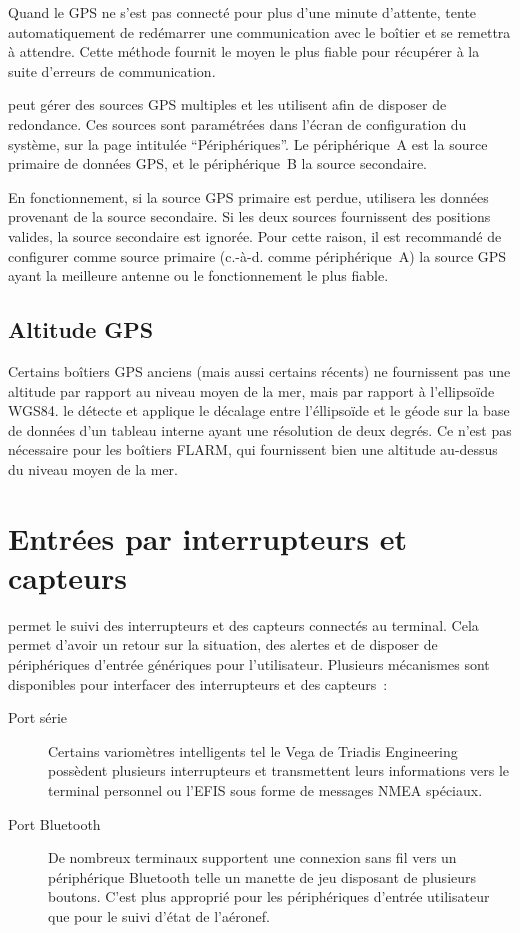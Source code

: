 Quand le GPS ne s'est pas connecté pour plus d'une minute d'attente, \xc{} tente automatiquement de redémarrer une communication avec le boîtier et se remettra à attendre.
Cette méthode fournit le moyen le plus fiable pour récupérer à la suite d'erreurs de communication.

\xc{} peut gérer des sources GPS multiples et les utilisent afin de disposer de redondance.
Ces sources sont paramétrées dans l'écran de configuration du système, sur la page intitulée ``Périphériques''.
Le périphérique~A est la source primaire de données GPS, et le périphérique~B la source secondaire.

En fonctionnement, si la source GPS primaire est perdue, \xc{} utilisera les données provenant de la source secondaire.
Si les deux sources fournissent des positions valides, la source secondaire est ignorée.
Pour cette raison, il est recommandé de configurer comme source primaire (c.-à-d. comme périphérique~A) la source GPS ayant la meilleure antenne ou le fonctionnement le plus fiable.

\subsection*{Altitude GPS}

Certains boîtiers GPS anciens (mais aussi certains récents) ne fournissent pas une altitude par rapport au niveau moyen de la mer, mais par rapport à l'ellipsoïde WGS84.
\xc{} le détecte et applique le décalage entre l'éllipsoïde et le géode sur la base de données d'un tableau interne ayant une résolution de deux degrés.
Ce n'est pas nécessaire pour les boîtiers FLARM, qui fournissent bien une altitude au-dessus du niveau moyen de la mer.


\section{Entrées par interrupteurs et capteurs}

\xc{} permet le suivi des interrupteurs et des capteurs connectés au terminal.
Cela permet d'avoir un retour sur la situation, des alertes et de disposer de périphériques d'entrée génériques pour l'utilisateur.
Plusieurs mécanismes sont disponibles pour interfacer des interrupteurs et des capteurs~:
\begin{description}
\item[Port série] Certains variomètres intelligents tel le Vega de Triadis Engineering possèdent plusieurs interrupteurs et transmettent leurs informations vers le terminal personnel ou l'EFIS sous forme de messages NMEA spéciaux.
\item[Port Bluetooth] De nombreux terminaux supportent une connexion sans fil vers un périphérique Bluetooth telle un manette de jeu disposant de plusieurs boutons.
C'est plus approprié pour les périphériques d'entrée utilisateur que pour le suivi d'état de l'aéronef.
\end{description}

